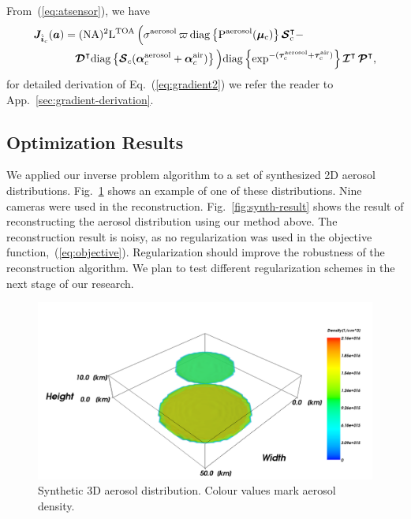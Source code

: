 \documentclass[10pt,twocolumn,letterpaper]{article}
\newcommand{\OpSphere}{\bm{\mathcal{S}}}
\newcommand{\OpDistance}{\bm{\mathcal{D}}}
\newcommand{\OpInt}{\bm{\mathcal{I}}}
\newcommand{\OpCamera}{\bm{\mathcal{P}}}
\newcommand{\OpDiag}[1]{\mathrm{diag}\left\{#1\right\}}
\newcommand{\vect}[1]{\bm{#1}}
\newcommand{\mat}[1]{\bm{#1}}
\newcommand{\transpose}[1]{{#1}^\intercal}
\begin{document}
\noindent From~(\ref{eq:atsensor}), we have
\begin{align}
  \mat{J}_{\hat{\vect{i}}_c}(\vect{a}) &= (\rm{NA})^2 \mathrm{L}^{\rm TOA}\,
  \Big( \sigma^{\rm aerosol} \, \varpi \, \OpDiag{P^{\rm
        aerosol}(\vect{\mu}_c)} \transpose{\OpSphere}_c - \nonumber \\
    &\quad \transpose{\OpDistance} \OpDiag{\OpSphere_c (\vect{\alpha}^{\rm
        aerosol}_c +
      \vect{\alpha}^{\rm air}_c )} \Big)
  \OpDiag{\exp^{-(\vect{\tau}^{\rm aerosol}_c + \vect{\tau}^{\rm
        air}_c)}} \transpose{\OpInt} \, \transpose{\OpCamera},
  \label{eq:gradient2}
\end{align}
for detailed derivation of Eq.~(\ref{eq:gradient2}) we refer the
reader to App.~\ref{sec:gradient-derivation}.

\subsection{Optimization Results}
\label{sec:optimization-results}

We applied our inverse problem algorithm to a set of synthesized 2D
aerosol distributions. Fig.~\ref{fig:synth-atmo} shows an example of
one of these distributions. Nine cameras were used in the
reconstruction. Fig.~\ref{fig:synth-result} shows the result of
reconstructing the aerosol distribution using our method above. The
reconstruction result is noisy, as no regularization was used in the
objective function,~(\ref{eq:objective}).  Regularization should
improve the robustness of the reconstruction algorithm.  We plan to
test different regularization schemes in the next stage of our
research.

\begin{figure}
  \centering
    \includegraphics[width=\columnwidth]{images/original}
  \caption{Synthetic 3D aerosol distribution. Colour values mark
    aerosol density.}
  \label{fig:synth-atmo}
\end{figure}
\end{document}
